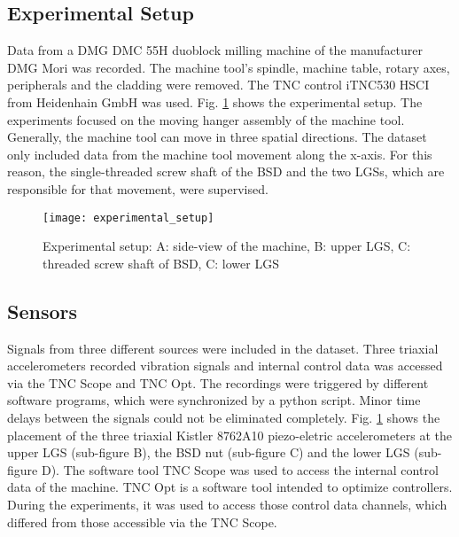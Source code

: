 \subsection{Experimental Setup}
Data from a DMG DMC 55H duoblock milling machine of the manufacturer DMG Mori was recorded. The machine tool’s spindle, machine table, rotary axes, peripherals and the cladding were removed. The TNC control iTNC530 HSCI from Heidenhain GmbH was used. Fig. \ref{fig:experimental_setup} shows the experimental setup. The experiments focused on the moving hanger assembly of the machine tool. Generally, the machine tool can move in three spatial directions. The dataset only included data from the machine tool movement along the x-axis. For this reason, the single-threaded screw shaft of the BSD and the two LGSs, which are responsible for that movement, were supervised.

\begin{figure}[H]
  \centering
  \texttt{[image: experimental\_setup]}
  \caption {Experimental setup: A: side-view of the machine, B: upper LGS, C: threaded screw shaft of BSD, C: lower LGS}
  \label{fig:experimental_setup}
\end{figure}

\subsection{Sensors}
Signals from three different sources were included in the dataset. Three triaxial accelerometers recorded vibration signals and internal control data was accessed via the TNC Scope and TNC Opt. The recordings were triggered by different software programs, which were synchronized by a python script. Minor time delays between the signals could not be eliminated completely. Fig. \ref{fig:experimental_setup} shows the placement of the three triaxial Kistler 8762A10 piezo-eletric accelerometers at the upper LGS (sub-figure B), the BSD nut (sub-figure C) and the lower LGS (sub-figure D). The software tool TNC Scope was used to access the internal control data of the machine. TNC Opt is a software tool intended to optimize controllers. During the experiments, it was used to access those control data channels, which differed from those accessible via the TNC Scope.

